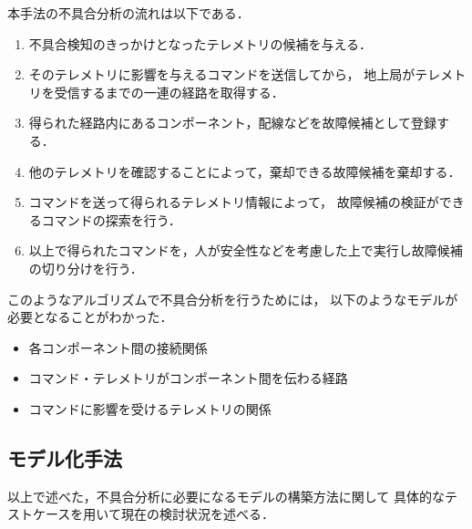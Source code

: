 \documentclass[11pt]{article}
\begin{document}
本手法の不具合分析の流れは以下である．
\renewcommand{\labelenumi}{\roman{enumi}}
\begin{enumerate}
   \item 不具合検知のきっかけとなったテレメトリの候補を与える．
   \item そのテレメトリに影響を与えるコマンドを送信してから，
   地上局がテレメトリを受信するまでの一連の経路を取得する．
   \item 得られた経路内にあるコンポーネント，配線などを故障候補として登録する．
   \item 他のテレメトリを確認することによって，棄却できる故障候補を棄却する．
   \item コマンドを送って得られるテレメトリ情報によって，
   故障候補の検証ができるコマンドの探索を行う．
   \item 以上で得られたコマンドを，人が安全性などを考慮した上で実行し故障候補の切り分けを行う．\\
\end{enumerate}
このようなアルゴリズムで不具合分析を行うためには，
以下のようなモデルが必要となることがわかった．
\begin{itemize}
   \item 各コンポーネント間の接続関係
   \item コマンド・テレメトリがコンポーネント間を伝わる経路
   \item コマンドに影響を受けるテレメトリの関係
\end{itemize}

\subsection{モデル化手法}
以上で述べた，不具合分析に必要になるモデルの構築方法に関して
具体的なテストケースを用いて現在の検討状況を述べる．
\end{document}
